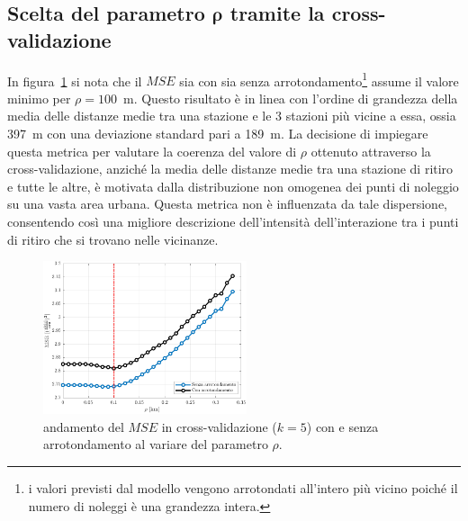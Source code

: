 \subsection{Scelta del parametro $\boldsymbol{\rho}$ tramite la cross-validazione}
In figura~\ref{MSE_cv} si nota che il $MSE$ sia con sia senza arrotondamento\footnote{i valori previsti dal modello vengono arrotondati all'intero più vicino poiché il numero di noleggi è una grandezza intera.} assume il valore minimo per $\rho=100$~\unit{\meter}. Questo risultato è in linea con l'ordine di grandezza della media delle distanze medie tra una stazione e le \num{3} stazioni più vicine a essa, ossia \num{397}~\unit{\meter} con una deviazione standard pari a \num{189}~\unit{\meter}. La decisione di impiegare questa metrica per valutare la coerenza del valore di $\rho$ ottenuto attraverso la cross-validazione, anziché la media delle distanze medie tra una stazione di ritiro e tutte le altre, è motivata dalla distribuzione non omogenea dei punti di noleggio su una vasta area urbana. Questa metrica non è influenzata da tale dispersione, consentendo così una migliore descrizione dell'intensità dell'interazione tra i punti di ritiro che si trovano nelle vicinanze.

\begin{figure}[htpb]
	\centering
	\includegraphics[height=170px]{Immagini/4. Caso di studio/Cross_validazione/MSE_rho_full_focus}
	\caption[Andamento del $MSE$ in cross-validazione con e senza arrotondamento al variare del parametro $\rho$]{andamento del $MSE$ in cross-validazione ($k=5$) con e senza arrotondamento al variare del parametro $\rho$.}
	\label{MSE_cv}
\end{figure}

